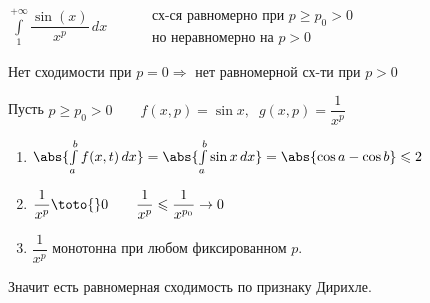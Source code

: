 \begin{example}\thmslashn
	
	$\int\limits_{1}^{+\infty} \dfrac{\sin(x)}{x^p}\,dx \qquad \begin{aligned}
		&\text{сх-ся равномерно при } p \geqslant p_0 > 0 \\
		&\text{но неравномерно на } p > 0
	\end{aligned}$
	
	Нет сходимости при $p = 0 \Rightarrow$ нет равномерной сх-ти при $p > 0$
	
	Пусть $p \geqslant p_0 > 0\qquad f(x, p) = \sin x, \;\; g(x, p) = \dfrac{1}{x^p}$
	
	\begin{enumerate}
		\item 
		$\abs{\int\limits_{a}^{b} f(x, t) \, dx} = \abs{\int\limits_{a}^{b} \sin x \, dx} = \abs{\cos a - \cos b} \leqslant 2$
		
		\item
		$\dfrac{1}{x^p} \toto{} 0 \qquad \dfrac{1}{x^p}\leqslant \dfrac{1}{x^{p_0}} \to 0$
		
		\item
		$\dfrac{1}{x^p}$ монотонна при любом фиксированном $p$.
	\end{enumerate}
	
	Значит есть равномерная сходимость по признаку Дирихле.
	
\end{example}